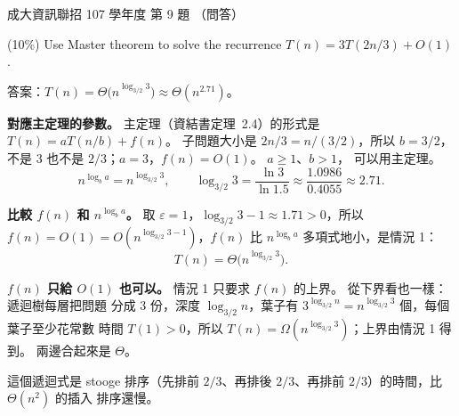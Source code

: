 \begin{pastexam}[label={px:ncku-107-prog-09}]{成大資訊聯招 107 學年度 第 9 題}
（問答）

(10\%) Use Master theorem to solve the recurrence $T(n)=3T(2n/3)+O(1)$.
\end{pastexam}

\begin{pastsoln}
答案：$T(n) = \Theta\bigl(n^{\log_{3/2} 3}\bigr) \approx \Theta(n^{2.71})$。

\textbf{對應主定理的參數。} 主定理（資結書定理~2.4）的形式是 $T(n) = aT(n/b) + f(n)$。 子問題大小是
$2n/3 = n/(3/2)$，所以 $b = 3/2$，不是 $3$ 也不是 $2/3$；$a = 3$，$f(n) = O(1)$。 $a \ge 1$、$b > 1$，
可以用主定理。
\[
n^{\log_b a} = n^{\log_{3/2} 3}, \qquad
\log_{3/2} 3 = \frac{\ln 3}{\ln 1.5} \approx \frac{1.0986}{0.4055} \approx 2.71 .
\]

\textbf{比較 $f(n)$ 和 $n^{\log_b a}$。} 取 $\varepsilon = 1$，$\log_{3/2} 3 - 1 \approx 1.71 > 0$，所以
$f(n) = O(1) = O(n^{\log_{3/2} 3 - 1})$，$f(n)$ 比 $n^{\log_b a}$ 多項式地小，是情況 1：
\[
T(n) = \Theta\bigl(n^{\log_{3/2} 3}\bigr).
\]

\textbf{$f(n)$ 只給 $O(1)$ 也可以。} 情況 1 只要求 $f(n)$ 的上界。 從下界看也一樣：遞迴樹每層把問題
分成 $3$ 份，深度 $\log_{3/2} n$，葉子有 $3^{\log_{3/2} n} = n^{\log_{3/2} 3}$ 個，每個葉子至少花常數
時間 $T(1) > 0$，所以 $T(n) = \Omega(n^{\log_{3/2} 3})$；上界由情況 1 得到。 兩邊合起來是 $\Theta$。

這個遞迴式是 stooge 排序（先排前 $2/3$、再排後 $2/3$、再排前 $2/3$）的時間，比 $\Theta(n^2)$ 的插入
排序還慢。
\end{pastsoln}
